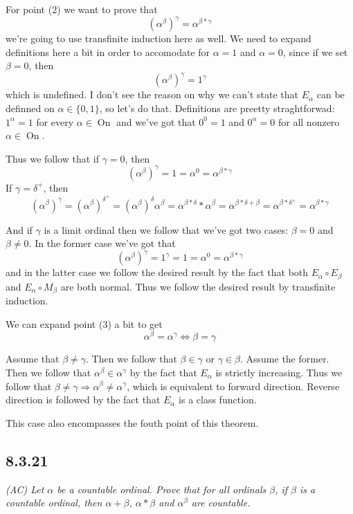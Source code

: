 \documentclass[11pt,oneside,titlepage]{book}
\DeclareMathOperator \ra {\Rightarrow}
\DeclareMathOperator \On {On}
\newcommand{\set}[1]{\{ #1 \}}
\begin{document}
For point (2) we want to prove that
$$(\alpha^\beta)^\gamma = \alpha^{\beta * \gamma}$$
we're going to use transfinite induction here as well. We need to expand definitions here a bit
in order to accomodate for $\alpha = 1$ and $\alpha = 0$, since if we set $\beta = 0$, then
$$(\alpha^\beta)^\gamma = 1^\gamma$$
which is undefined.
I don't see the reason on why we
can't state that $E_\alpha$ can be definned on $\alpha \in \set{0, 1}$, so let's do that.
Definitions are preetty straghtforwad: $1^\alpha = 1$ for every $\alpha \in \On$ and
we've got that $0^0 = 1$ and $0^\alpha = 0$ for all nonzero $\alpha \in \On$.

Thus we follow that if $\gamma = 0$, then
$$(\alpha^\beta)^\gamma = 1 = \alpha^0 = \alpha^{\beta * \gamma}$$
If $\gamma = \delta^+$, then
$$(\alpha^\beta)^\gamma = (\alpha^\beta)^{\delta^+} = (\alpha^\beta)^{\delta} \alpha^\beta =
\alpha^{\beta * \delta} * \alpha^\beta = \alpha^{\beta * \delta + \beta} = \alpha^{\beta * \delta^+} =
\alpha^{\beta * \gamma}$$

And if $\gamma$ is a limit ordinal then we follow that we've got two cases: $\beta = 0$
and $\beta \neq 0$. In the former case we've got that
$$(\alpha^\beta)^\gamma = 1^\gamma = 1 = \alpha^0 = \alpha^{\beta * \gamma}$$
and in the latter case we follow the desired result by the fact that both
$E_\alpha \circ E_\beta$ and $E_\alpha \circ M_\beta$ are both normal.
Thus we follow the desired result by transfinite induction.

We can expand point (3) a bit to get
$$\alpha^\beta = \alpha^\gamma \iff \beta = \gamma$$

Assume that $\beta \neq \gamma$. Then we follow that $\beta \in \gamma$ or $\gamma  \in \beta$.
Assume the former. Then we follow that $\alpha^\beta \in \alpha^\gamma$ by the fact that
$E_\alpha$ is strictly increasing. Thus we follow that $\beta \neq \gamma \ra \alpha^\beta
\neq \alpha^\gamma$, which is equivalent to forward direction. Reverse direction is
followed by the fact that $E_\alpha$ is a class function.

This case also encompasses the fouth point of this theorem.

\subsection*{8.3.21}

\textit{(AC) Let $\alpha$ be a countable ordinal. Prove that for all ordinals $\beta$,
  if $\beta$ is a countable ordinal, then $\alpha + \beta$, $\alpha * \beta$
  and $\alpha^\beta$ are countable.}
\end{document}
